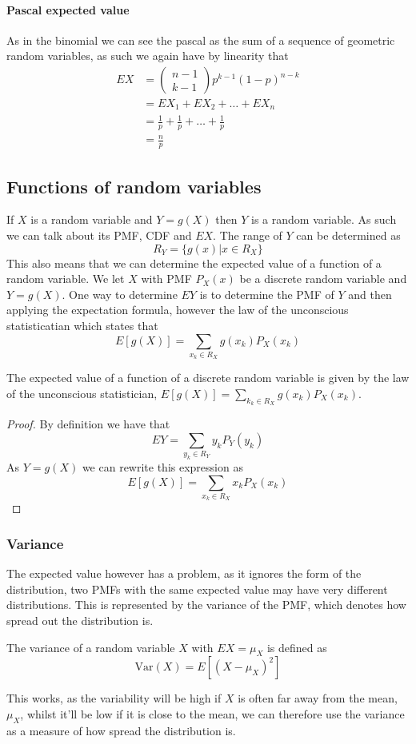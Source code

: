 \paragraph{Pascal expected value}
As in the binomial we can see the pascal as the sum of a sequence of geometric random variables, as such we again have by linearity that
\begin{align*}
    EX&=\begin{pmatrix}n-1\\k-1\end{pmatrix}p^{k-1}(1-p)^{n-k} \\
      &=EX_{1}+EX_{2}+\ldots+EX_{n} \\
      &=\frac{1}{p}+\frac{1}{p}+\ldots+\frac{1}{p} \\
      &=\frac{n}{p}
\end{align*}
\subsection{Functions of random variables}
If $X$ is a random variable and $Y=g(X)$ then $Y$ is a random variable. As such we can talk about its PMF, CDF and $EX$. The range of $Y$ can be determined as
\[
    R_{Y}=\{g(x)|x\in R_{X}\}
\]
This also means that we can determine the expected value of a function of a random variable. We let $X$ with PMF $P_{X}(x)$ be a discrete random variable and $Y=g(X)$. One way to determine $EY$ is to determine the PMF of $Y$ and then applying the expectation formula, however the law of the unconscious statisticatian which states that
\[
    E[g(X)]=\sum_{x_{k}\in R_{X}}g(x_{k})P_{X}(x_{k})
\]
\begin{theorem}
    The expected value of a function of a discrete random variable is given by the law of the unconscious statistician, $E[g(X)]=\sum_{k_{k}\in R_{X}}g(x_{k})P_{X}(x_{k})$.
\end{theorem}
\begin{proof}
    By definition we have that
    \[
        EY=\sum_{y_{k}\in R_{Y}}y_{k}P_{Y}(y_{k})
    \]
    As $Y=g(X)$ we can rewrite this expression as
    \[
        E[g(X)]=\sum_{x_{k}\in R_{X}}x_{k}P_{X}(x_{k})
    \]
\end{proof}
\subsubsection{Variance}
The expected value however has a problem, as it ignores the form of the distribution, two PMFs with the same expected value may have very different distributions. This is represented by the variance of the PMF, which denotes how spread out the distribution is.
\begin{definition}
  The variance of a random variable $X$ with $EX=\mu_{X}$ is defined as
  \[
      \text{Var}(X)=E[(X-\mu_{X})^{2}]
  \]
\end{definition}
This works, as the variability will be high if $X$ is often far away from the mean, $\mu_{X}$, whilst it'll be low if it is close to the mean, we can therefore use the variance as a measure of how spread the distribution is.

